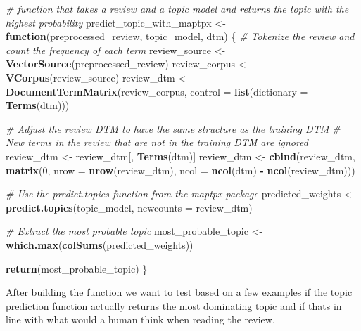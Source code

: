 \documentclass[
]{article}
\newenvironment{Shaded}{\begin{snugshade}}{\end{snugshade}}
\newcommand{\AttributeTok}[1]{\textcolor[rgb]{0.13,0.29,0.53}{#1}}
\newcommand{\CommentTok}[1]{\textcolor[rgb]{0.56,0.35,0.01}{\textit{#1}}}
\newcommand{\ControlFlowTok}[1]{\textcolor[rgb]{0.13,0.29,0.53}{\textbf{#1}}}
\newcommand{\DecValTok}[1]{\textcolor[rgb]{0.00,0.00,0.81}{#1}}
\newcommand{\FunctionTok}[1]{\textcolor[rgb]{0.13,0.29,0.53}{\textbf{#1}}}
\newcommand{\NormalTok}[1]{#1}
\newcommand{\OtherTok}[1]{\textcolor[rgb]{0.56,0.35,0.01}{#1}}
\newcommand{\SpecialCharTok}[1]{\textcolor[rgb]{0.81,0.36,0.00}{\textbf{#1}}}
\begin{document}
\begin{Shaded}
\begin{Highlighting}[]
\CommentTok{\# function that takes a review and a topic model and returns the topic with the highest probability}
\NormalTok{predict\_topic\_with\_maptpx }\OtherTok{\textless{}{-}} \ControlFlowTok{function}\NormalTok{(preprocessed\_review, topic\_model, dtm) \{}
  \CommentTok{\# Tokenize the review and count the frequency of each term}
\NormalTok{  review\_source }\OtherTok{\textless{}{-}} \FunctionTok{VectorSource}\NormalTok{(preprocessed\_review)}
\NormalTok{  review\_corpus }\OtherTok{\textless{}{-}} \FunctionTok{VCorpus}\NormalTok{(review\_source)}
\NormalTok{  review\_dtm }\OtherTok{\textless{}{-}} \FunctionTok{DocumentTermMatrix}\NormalTok{(review\_corpus, }\AttributeTok{control =} \FunctionTok{list}\NormalTok{(}\AttributeTok{dictionary =} \FunctionTok{Terms}\NormalTok{(dtm)))}

  \CommentTok{\# Adjust the review DTM to have the same structure as the training DTM}
  \CommentTok{\# New terms in the review that are not in the training DTM are ignored}
\NormalTok{  review\_dtm }\OtherTok{\textless{}{-}}\NormalTok{ review\_dtm[, }\FunctionTok{Terms}\NormalTok{(dtm)]}
\NormalTok{  review\_dtm }\OtherTok{\textless{}{-}} \FunctionTok{cbind}\NormalTok{(review\_dtm, }\FunctionTok{matrix}\NormalTok{(}\DecValTok{0}\NormalTok{, }\AttributeTok{nrow =} \FunctionTok{nrow}\NormalTok{(review\_dtm), }\AttributeTok{ncol =} \FunctionTok{ncol}\NormalTok{(dtm) }\SpecialCharTok{{-}} \FunctionTok{ncol}\NormalTok{(review\_dtm)))}

  \CommentTok{\# Use the predict.topics function from the maptpx package}
\NormalTok{  predicted\_weights }\OtherTok{\textless{}{-}} \FunctionTok{predict.topics}\NormalTok{(topic\_model, }\AttributeTok{newcounts =}\NormalTok{ review\_dtm)}
  
  \CommentTok{\# Extract the most probable topic}
\NormalTok{  most\_probable\_topic }\OtherTok{\textless{}{-}} \FunctionTok{which.max}\NormalTok{(}\FunctionTok{colSums}\NormalTok{(predicted\_weights))}
  
  \FunctionTok{return}\NormalTok{(most\_probable\_topic)}
\NormalTok{\}}
\end{Highlighting}
\end{Shaded}

After building the function we want to test based on a few examples if
the topic prediction function actually returns the most dominating topic
and if thats in line with what would a human think when reading the
review.
\end{document}
